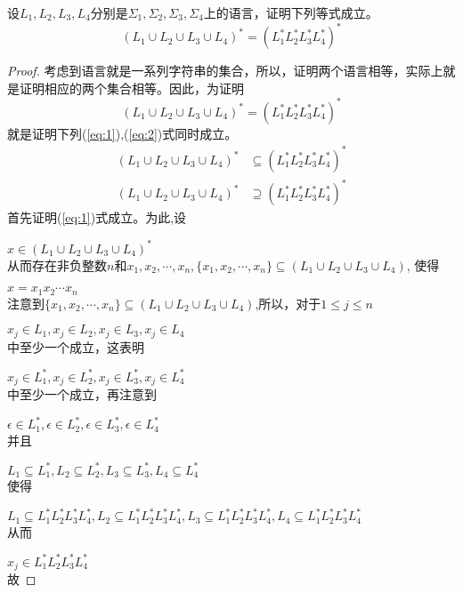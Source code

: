\begin{exercise}
	设$L_1,L_2,L_3,L_4$分别是$\Sigma_1,\Sigma_2,\Sigma_3,\Sigma_4$上的语言，证明下列等式成立。
	$$(L_1\cup L_2\cup L_3\cup L_4)^\ast=(L_1^\ast L_2^\ast L_3^\ast L_4^\ast)^\ast$$
\end{exercise}

\begin{solution}
	\begin{proof}
		考虑到语言就是一系列字符串的集合，所以，证明两个语言相等，实际上就是证明相应的两个集合相等。因此，为证明
		$$(L_1\cup L_2\cup L_3\cup L_4)^\ast=(L_1^\ast L_2^\ast L_3^\ast L_4^\ast)^\ast$$
		就是证明下列(\ref{eq:1}),(\ref{eq:2})式同时成立。
		\begin{align*}
		(L_1\cup L_2\cup L_3\cup L_4)^\ast &\subseteq(L_1^\ast L_2^\ast L_3^\ast L_4^\ast)^\ast \tag{1}\label{eq:1} \\
		(L_1\cup L_2\cup L_3\cup L_4)^\ast &\supseteq(L_1^\ast L_2^\ast L_3^\ast L_4^\ast)^\ast \tag{2}\label{eq:2}
		\end{align*}
		首先证明(\ref{eq:1})式成立。为此,设
		
		$x\in (L_1\cup L_2\cup L_3\cup L_4)^\ast$\\
		从而存在非负整数$n$和$x_1,x_2,\cdots,x_n,\{x_1,x_2,\cdots,x_n\}\subseteq(L_1\cup L_2\cup L_3\cup L_4)$, 使得
		
		$x=x_1x_2\cdots x_n$\\
		注意到$\{x_1,x_2,\cdots,x_n\}\subseteq(L_1\cup L_2\cup L_3\cup L_4)$,所以，对于$1\le j\le n$
		
		$x_j\in L_1,x_j\in L_2,x_j\in L_3,x_j\in L_4$\\
		中至少一个成立，这表明
		
		$x_j\in L_1^\ast,x_j\in L_2^\ast,x_j\in L_3^\ast,x_j\in L_4^\ast$\\
		中至少一个成立，再注意到
		
		$\epsilon\in L_1^\ast,\epsilon\in L_2^\ast,\epsilon\in L_3^\ast,\epsilon\in L_4^\ast$\\
		并且
		
		$L_1\subseteq L_1^\ast,L_2\subseteq L_2^\ast,L_3\subseteq L_3^\ast,L_4\subseteq L_4^\ast$\\
		使得
		
		$L_1\subseteq L_1^\ast L_2^\ast L_3^\ast L_4^\ast,L_2\subseteq L_1^\ast L_2^\ast L_3^\ast L_4^\ast,L_3\subseteq L_1^\ast L_2^\ast L_3^\ast L_4^\ast,L_4\subseteq L_1^\ast L_2^\ast L_3^\ast L_4^\ast$\\
		从而
		
		$x_j\in  L_1^\ast L_2^\ast L_3^\ast L_4^\ast$\\
		故
		

\end{proof}
\end{solution}
